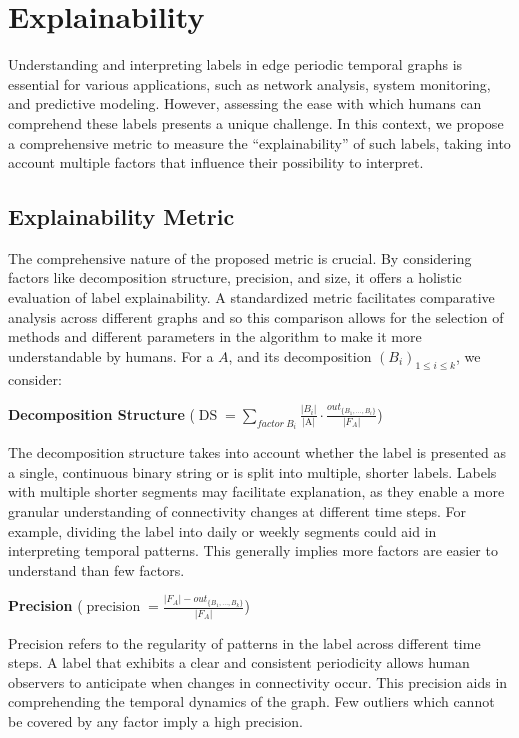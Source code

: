 \chapter{Explainability}

Understanding and interpreting labels in edge periodic temporal graphs is essential for various applications, such as network analysis, system monitoring, and predictive modeling.
However, assessing the ease with which humans can comprehend these labels presents a unique challenge.
In this context, we propose a comprehensive metric to measure the \enquote{explainability} of such labels, taking into account multiple factors that influence their possibility to interpret.

\section{Explainability Metric}
The comprehensive nature of the proposed metric is crucial.
By considering factors like decomposition structure, precision, and size, it offers a holistic evaluation of label explainability.
A standardized metric facilitates comparative analysis across different graphs and so this comparison allows for the selection of methods and different parameters in the algorithm to make it more understandable by humans. For a \DFA $A$, and its decomposition $(B_i)_{1 \leq i \leq k}$, we consider:

\textbf{Decomposition Structure} ($\operatorname{DS} = \sum\limits_{factor~ B_i}\frac{|B_i|}{\text{|A|}} \cdot \frac{out_{\{B_1,\dots,B_i\}}}{|F_A|}$)

The decomposition structure takes into account whether the label is presented as a single, continuous binary string or is split into multiple, shorter labels.
Labels with multiple shorter segments may facilitate explanation, as they enable a more granular understanding of connectivity changes at different time steps.
For example, dividing the label into daily or weekly segments could aid in interpreting temporal patterns.
This generally implies more factors are easier to understand than few factors.

\textbf{Precision} ($\operatorname{precision} = \frac{|F_A| - out_{\{B_1,\dots,B_k\}}}{|F_A|}$)

Precision refers to the regularity of patterns in the label across different time steps.
A label that exhibits a clear and consistent periodicity allows human observers to anticipate when changes in connectivity occur.
This precision aids in comprehending the temporal dynamics of the graph.
Few outliers which cannot be covered by any factor imply a high precision.

